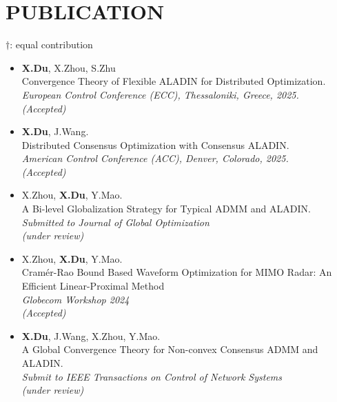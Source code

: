 \documentclass[paper=a4,fontsize=11pt]{scrartcl} %
\newcommand{\NewPart}[1]{\section*{\uppercase{#1}}}
\newcommand{\EducationEntry}[4]{
		\noindent \textbf{#1} \hfill      %
		\colorbox{White}{%
			\parbox{5cm}{%
			\hfill\color{Black}#2}} \par  %
		\noindent \textit{#3} \par        %
		\noindent\hangindent=2em\hangafter=0 \small #4 %
		\normalsize \par}
\begin{document}
\NewPart{PUBLICATION}{}
$\dag$:  equal contribution
\begin{itemize}
	
		
	\item  {\textbf{X.Du}, X.Zhou, S.Zhu \\
		{ Convergence Theory of Flexible ALADIN for Distributed Optimization.}\\
		\emph{European Control Conference (ECC), Thessaloniki, Greece, 2025.\\(Accepted)
	} }
	
		\item  {\textbf{X.Du}, J.Wang. \\
		{ Distributed Consensus Optimization with Consensus ALADIN.}\\
		\emph{American Control Conference (ACC), Denver, Colorado, 2025.\\(Accepted)
	} }
	
		\item  {X.Zhou, \textbf{X.Du},   Y.Mao. \\
		{A Bi-level Globalization Strategy for Typical  ADMM and ALADIN.}\\
		\emph{Submitted to Journal of Global Optimization\\
			(under review)
	} }
		\item  {X.Zhou, \textbf{X.Du},   Y.Mao. \\
		{Cram\'er-Rao Bound Based Waveform Optimization for MIMO Radar: An Efficient Linear-Proximal Method}\\
		\emph{Globecom Workshop 2024\\
			(Accepted)
	} }
	
		\item  {\textbf{X.Du}, J.Wang, X.Zhou, Y.Mao. \\
		{A Global Convergence Theory for Non-convex Consensus ADMM and ALADIN.}\\
		\emph{Submit to  IEEE Transactions on Control of Network Systems\\
			(under review)
	} }
	
%	


\end{itemize}
\end{document}
